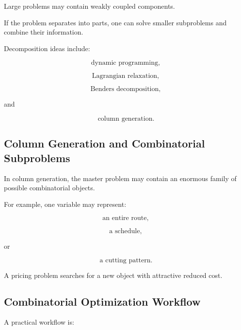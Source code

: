 Large problems may contain weakly coupled components.

If the problem separates into parts, one can solve smaller subproblems and
combine their information.

Decomposition ideas include:

\[
\boxed{
\text{dynamic programming},
}
\]

\[
\boxed{
\text{Lagrangian relaxation},
}
\]

\[
\boxed{
\text{Benders decomposition},
}
\]

and

\[
\boxed{
\text{column generation}.
}
\]

\subsection{Column Generation and Combinatorial Subproblems}
\label{subsec:column-generation-combinatorial}

In column generation, the master problem may contain an enormous family of
possible combinatorial objects.

For example, one variable may represent:

\[
\boxed{
\text{an entire route},
}
\]

\[
\boxed{
\text{a schedule},
}
\]

or

\[
\boxed{
\text{a cutting pattern}.
}
\]

A pricing problem searches for a new object with attractive reduced cost.

\subsection{Combinatorial Optimization Workflow}
\label{subsec:combinatorial-optimization-workflow}

A practical workflow is:

